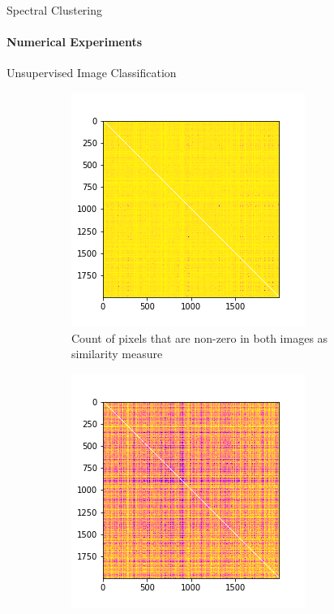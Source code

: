 \documentclass[10pt,a4paper, nocenter]{beamer}
\begin{document}
	\begin{frame}{Spectral Clustering}
	\framesubtitle{Numerical Experiments}
	Unsupervised Image Classification
        \begin{figure}[h]
		\begin{center}
			\begin{subfigure}[b]{0.3\textwidth}
				\centering
				\includegraphics[width=\textwidth]{../../images/w_0norm.png}
				\caption{Count of pixels that are non-zero in both images as similarity measure}
				\label{fig:w_0norm}
			\end{subfigure}           
			\begin{subfigure}[b]{0.3\textwidth}
				\centering
				\includegraphics[width=\textwidth]{../../images/w_2norm.png}

\end{subfigure}
\end{center}
\end{figure}
\end{frame}
\end{document}
